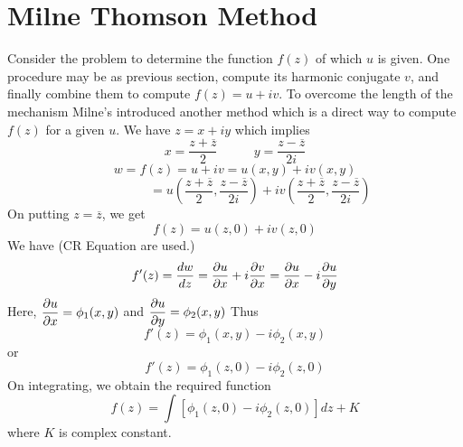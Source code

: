 \section{Milne Thomson Method}
Consider the problem to determine the function $f(z)$ of which $u$ is given. One procedure may be as previous section, compute its harmonic conjugate $v$, and finally combine them to compute $f(z)=u+iv$. To overcome the length of the mechanism Milne's introduced another method which is a direct way to compute $f(z)$ for a given $u$.
We have $z=x+iy$ which implies
\[x = \frac{z+\overline{z}}{2} ~~~~~~~~~~~~~y = \frac{z-\overline{z}}{2i}\]
\[w = f(z) = u+iv = u(x,y) + i v(x,y)\]
\[~~~~~~~~~~~~~~~~~~= u\left(\frac{z+\overline{z}}{2},\frac{z-\overline{z}}{2i}\right) + iv\left(\frac{z+\overline{z}}{2},\frac{z-\overline{z}}{2i}\right)\]
On putting $z=\overline{z}$, we get
\[f(z) = u(z,0) + i v(z,0)\]
We have (CR Equation are used.)
\[f'(z)={\frac{dw}{dz}} = \displaystyle \frac{\partial u}{\partial x} + i \displaystyle \frac{\partial v}{\partial x} =  \displaystyle \frac{\partial u}{\partial x} - i \displaystyle \frac{\partial u}{\partial y} \]
Here, $\displaystyle \frac{\partial u}{\partial x} = \phi_1(x,y)$ and $\displaystyle \frac{\partial u}{\partial y} = \phi_2(x,y)$
Thus
\[f'(z)= \phi_1(x,y)- i \phi_2(x,y)\]
or
\[f'(z)= \phi_1(z,0)- i \phi_2(z,0)\]
On integrating, we obtain the required function
\[f(z)= \int [\phi_1(z,0)- i \phi_2(z,0)] dz + K\]
where $K$ is complex constant.

